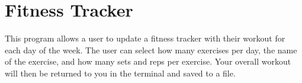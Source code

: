 \chapter{Fitness Tracker}
\hypertarget{index}{}\label{index}
\label{index_md__c_1_2_users_2medhi_2_one_drive_01-_01_technological_01_university_01_dublin_21st_01_year_2_documents_2_git_hub_2_t_u821-_fitness-_tracker_2_r_e_a_d_m_e}%
%
 This program allows a user to update a fitness tracker with their workout for each day of the week. The user can select how many exercises per day, the name of the exercise, and how many sets and reps per exercise. Your overall workout will then be returned to you in the terminal and saved to a file. 